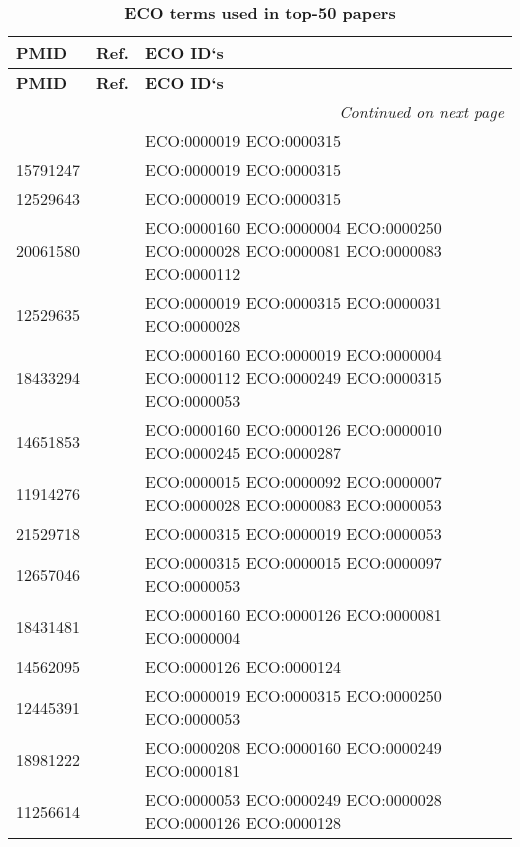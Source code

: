 
\begin{longtable}[!ht]{|l|l|p{10cm}|}
\caption{\textbf{ECO terms used in top-50 papers}} \\
\hline
\textbf{PMID} & \textbf{Ref.} & \textbf{ECO ID`s} \\ \hline
\endfirsthead
\hline
\textbf{PMID} & \textbf{Ref.} & \textbf{ECO ID`s} \\ \hline 
\endhead
\hline
\multicolumn{3}{r}{\textit{Continued on next page}} \\
\endfoot
\hline
\endlastfoot
14551910 &  \cite{pmid14551910}  & ECO:0000019 ECO:0000315 \\ \hline
15791247 &  \cite{pmid15791247}  & ECO:0000019 ECO:0000315 \\ \hline
12529643 &  \cite{pmid12529643}  & ECO:0000019 ECO:0000315 \\ \hline
20061580 &  \cite{pmid20061580}  & ECO:0000160 ECO:0000004 ECO:0000250 ECO:0000028 ECO:0000081 ECO:0000083  
ECO:0000112 \\ \hline
12529635 &  \cite{pmid12529635}  & ECO:0000019 ECO:0000315 ECO:0000031 ECO:0000028 \\ \hline
18433294 &  \cite{pmid18433294}  & ECO:0000160 ECO:0000019 ECO:0000004 ECO:0000112 ECO:0000249 ECO:0000315 ECO:0000053 \\ \hline
14651853 &  \cite{pmid14651853}  & ECO:0000160 ECO:0000126 ECO:0000010 ECO:0000245 ECO:0000287 \\ \hline
11914276 &  \cite{pmid11914276}  & ECO:0000015 ECO:0000092 ECO:0000007 ECO:0000028 ECO:0000083 ECO:0000053 \\ \hline
21529718 &  \cite{pmid21529718}  & ECO:0000315 ECO:0000019 ECO:0000053 \\ \hline
12657046 &  \cite{pmid12657046}  & ECO:0000315 ECO:0000015 ECO:0000097 ECO:0000053 \\ \hline
18431481 &  \cite{pmid18431481}  & ECO:0000160 ECO:0000126 ECO:0000081 ECO:0000004 \\ \hline
14562095 &  \cite{pmid14562095}  & ECO:0000126 ECO:0000124 \\ \hline
12445391 &  \cite{pmid12445391}  & ECO:0000019 ECO:0000315 ECO:0000250 ECO:0000053 \\ \hline
18981222 &  \cite{pmid18981222}  & ECO:0000208 ECO:0000160 ECO:0000249 ECO:0000181 \\ \hline
11256614 &  \cite{pmid11256614}  & ECO:0000053 ECO:0000249 ECO:0000028 ECO:0000126 ECO:0000128 \\ \hline

\end{longtable}
